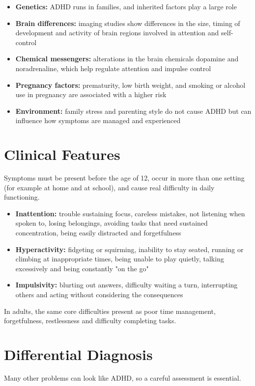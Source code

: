\begin{itemize}
    \item \textbf{Genetics:} ADHD runs in families, and inherited factors play a large role
    \item \textbf{Brain differences:} imaging studies show differences in the size, timing of development and activity of brain regions involved in attention and self-control
    \item \textbf{Chemical messengers:} alterations in the brain chemicals dopamine and noradrenaline, which help regulate attention and impulse control
    \item \textbf{Pregnancy factors:} prematurity, low birth weight, and smoking or alcohol use in pregnancy are associated with a higher risk
    \item \textbf{Environment:} family stress and parenting style do not cause ADHD but can influence how symptoms are managed and experienced
\end{itemize}

\section*{Clinical Features}
Symptoms must be present before the age of 12, occur in more than one setting (for example at home and at school), and cause real difficulty in daily functioning.

\begin{itemize}
    \item \textbf{Inattention:} trouble sustaining focus, careless mistakes, not listening when spoken to, losing belongings, avoiding tasks that need sustained concentration, being easily distracted and forgetfulness
    \item \textbf{Hyperactivity:} fidgeting or squirming, inability to stay seated, running or climbing at inappropriate times, being unable to play quietly, talking excessively and being constantly "on the go"
    \item \textbf{Impulsivity:} blurting out answers, difficulty waiting a turn, interrupting others and acting without considering the consequences
\end{itemize}
In adults, the same core difficulties present as poor time management, forgetfulness, restlessness and difficulty completing tasks.

\section*{Differential Diagnosis}
Many other problems can look like ADHD, so a careful assessment is essential.


